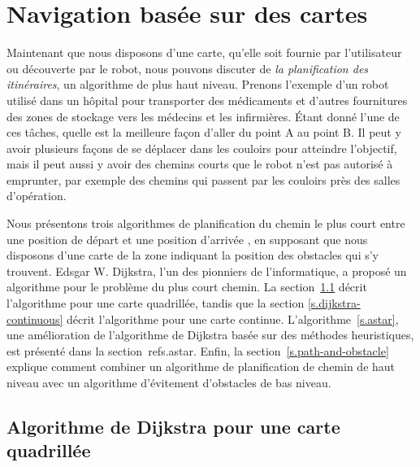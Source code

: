 
\chapter{Navigation basée sur des cartes}\label{ch.map-based}

Maintenant que nous disposons d'une carte, qu'elle soit fournie par l'utilisateur ou découverte par le robot, nous pouvons discuter de \emph{la planification des itinéraires}, un algorithme de plus haut niveau. Prenons l'exemple d'un robot utilisé dans un hôpital pour transporter des médicaments et d'autres fournitures des zones de stockage vers les médecins et les infirmières. Étant donné l'une de ces tâches, quelle est la meilleure façon d'aller du point A au point B. Il peut y avoir plusieurs façons de se déplacer dans les couloirs pour atteindre l'objectif, mais il peut aussi y avoir des chemins courts que le robot n'est pas autorisé à emprunter, par exemple des chemins qui passent par les couloirs près des salles d'opération.

Nous présentons trois algorithmes de planification du chemin le plus court entre une position de départ  et une position d'arrivée , en supposant que nous disposons d'une carte de la zone indiquant la position des obstacles qui s'y trouvent. Edsgar W. Dijkstra, l'un des pionniers de l'informatique, a proposé un algorithme pour le problème du plus court chemin. La section~\ref{s.dijkstra-grid} décrit l'algorithme pour une carte quadrillée, tandis que la section \ref{s.dijkstra-continuous} décrit l'algorithme pour une carte continue. L'algorithme~\ref{s.astar}, une amélioration de l'algorithme de Dijkstra basée sur des méthodes heuristiques, est présenté dans la section~ref{s.astar}. Enfin, la section~\ref{s.path-and-obstacle} explique comment combiner un algorithme de planification de chemin de haut niveau avec un algorithme d'évitement d'obstacles de bas niveau.

\section{Algorithme de Dijkstra pour une carte quadrillée} \label{s.dijkstra-grid}

